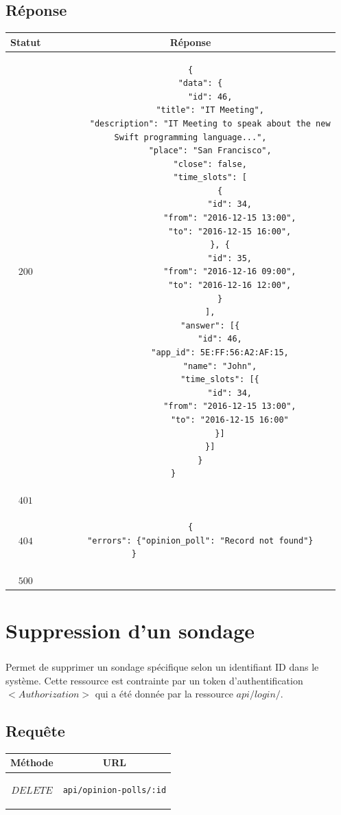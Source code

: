 \documentclass[titlepage]{report}
\begin{document}
\section{Réponse}

\begin{center}
	\begin{tabular}{|c|c|}
		\hline
		Statut & Réponse \\
		\hline
		$ 200 $ & \begin{lstlisting}
{
	"data": {
		"id": 46,
		"title": "IT Meeting",
		"description": "IT Meeting to speak about the new
Swift programming language...",
		"place": "San Francisco",
		"close": false,
		"time_slots": [
			{
				"id": 34,
				"from": "2016-12-15 13:00",
				"to": "2016-12-15 16:00",
			}, {
				"id": 35,
				"from": "2016-12-16 09:00",
				"to": "2016-12-16 12:00",
			}
		],
		"answer": [{
			"id": 46,
			"app_id": 5E:FF:56:A2:AF:15,
			"name": "John",
			"time_slots": [{
				"id": 34,
				"from": "2016-12-15 13:00",
				"to": "2016-12-15 16:00"
			}]
		}]
	}
}		
		\end{lstlisting} \\ 
		\hline
		$ 401 $ & \\
		\hline
		$ 404 $ &\begin{lstlisting}
{
	"errors": {"opinion_poll": "Record not found"}
}						
		\end{lstlisting}
		\\
		\hline
		$ 500 $ & \\
		\hline
	\end{tabular}
\end{center}


\chapter{Suppression d'un sondage}

\paragraph{} Permet de supprimer un sondage spécifique selon un identifiant ID dans le système. Cette ressource est contrainte par un token d'authentification $<Authorization>$ qui a été donnée par la ressource $api/login/$.

\section{Requête}

\begin{center}
	\begin{tabular}{|c|c|}
		\hline
		Méthode & URL \\
		\hline
		$ DELETE $ 
		&
		\begin{lstlisting}
api/opinion-polls/:id
		\end{lstlisting} 
		\\ \hline
	\end{tabular}
\end{center}
\end{document}
